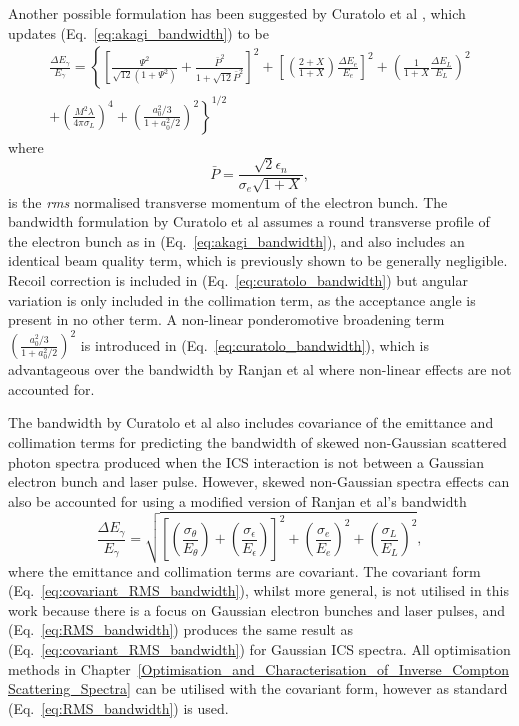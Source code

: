 \documentclass[../main.tex]{subfiles}
\begin{document}
Another possible formulation has been suggested by Curatolo et al \cite{curatolo2017analytical}, which updates (Eq.~\ref{eq:akagi_bandwidth}) to be
\begin{multline}
\frac{\Delta E_{\gamma}}{E_{\gamma}} = \left\{\left[\frac{\Psi^{2}}{\sqrt{12}\left(1+\Psi^{2}\right)}+\frac{\bar{P}^{2}}{1+\sqrt{12}\bar{P}^{2}}\right]^{2}+\left[\left(\frac{2+X}{1+X}\right)\frac{\Delta E_{e}}{E_{e}}\right]^{2}+\left(\frac{1}{1+X}\frac{\Delta E_{L}}{E_{L}}\right)^{2} \right.\\\left. +\left(\frac{M^{2}\lambda}{4\pi\sigma_{L}}\right)^{4}+\left(\frac{a_{0}^{2}/3}{1+a_{0}^{2}/2}\right)^{2}\right\}^{1/2}
\label{eq:curatolo_bandwidth}    
\end{multline}
where 
\begin{equation}
\bar{P} = \frac{\sqrt{2}\epsilon_{n}}{\sigma_{e}\sqrt{1+X}},
\label{eq:curatolo_p_bar}    
\end{equation}
is the \textit{rms} normalised transverse momentum of the electron bunch. The bandwidth formulation by Curatolo et al assumes a round transverse profile of the electron bunch as in (Eq.~\ref{eq:akagi_bandwidth}), and also includes an identical beam quality term, which is previously shown to be generally negligible. Recoil correction is included in (Eq.~\ref{eq:curatolo_bandwidth}) but angular variation is only included in the collimation term, as the acceptance angle is present in no other term. A non-linear ponderomotive broadening term $\left(\frac{a_{0}^{2}/3}{1+a_{0}^{2}/2}\right)^{2}$ is introduced in (Eq.~\ref{eq:curatolo_bandwidth}), which is advantageous over the bandwidth by Ranjan et al \cite{ranjan2018simulation} where non-linear effects are not accounted for. 

The bandwidth by Curatolo et al \cite{curatolo2017analytical} also includes covariance of the emittance and collimation terms for predicting the bandwidth of skewed non-Gaussian scattered photon spectra \cite{ranjan2018simulation} produced when the ICS interaction is not between a Gaussian electron bunch and laser pulse. However, skewed non-Gaussian spectra effects can also be accounted for using a modified version of Ranjan et al's bandwidth
\begin{equation}
\frac{\Delta E_{\gamma}}{E_{\gamma}} = \sqrt{\left[\left(\frac{\sigma_{\theta}}{E_{\theta}}\right)+\left(\frac{\sigma_{\epsilon}}{E_{\epsilon}}\right)\right]^{2}+\left(\frac{\sigma_{e}}{E_{e}}\right)^{2}+\left(\frac{\sigma_{L}}{E_{L}}\right)^{2}},
\label{eq:covariant_RMS_bandwidth}    
\end{equation}
where the emittance and collimation terms are covariant. The covariant form (Eq.~\ref{eq:covariant_RMS_bandwidth}), whilst more general, is not utilised in this work because there is a focus on Gaussian electron bunches and laser pulses, and (Eq.~\ref{eq:RMS_bandwidth}) produces the same result as (Eq.~\ref{eq:covariant_RMS_bandwidth}) for Gaussian ICS spectra. All optimisation methods in Chapter~\ref{Optimisation_and_Characterisation_of_Inverse_Compton Scattering_Spectra} can be utilised with the covariant form, however as standard (Eq.~\ref{eq:RMS_bandwidth}) is used. 
\end{document}

